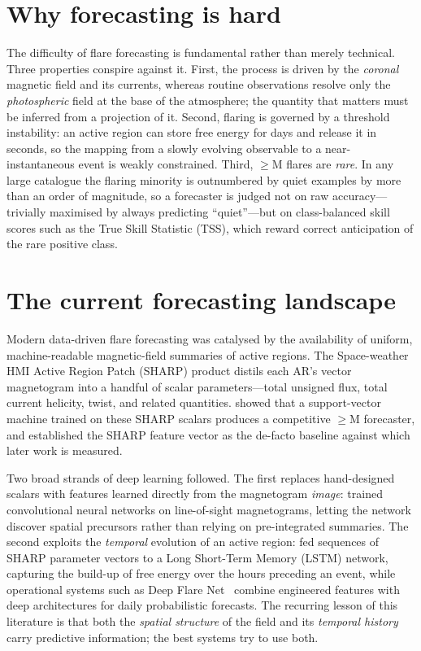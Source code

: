 

\section{Why forecasting is hard}

The difficulty of flare forecasting is fundamental rather than merely technical.
Three properties conspire against it. First, the process is driven by the
\emph{coronal} magnetic field and its currents, whereas routine observations
resolve only the \emph{photospheric} field at the base of the atmosphere; the
quantity that matters must be inferred from a projection of it. Second, flaring
is governed by a threshold instability: an active region can store free energy
for days and release it in seconds, so the mapping from a slowly evolving
observable to a near-instantaneous event is weakly constrained. Third, $\geq$M
flares are \emph{rare}. In any large catalogue the flaring minority is
outnumbered by quiet examples by more than an order of magnitude, so a
forecaster is judged not on raw accuracy---trivially maximised by always
predicting ``quiet''---but on class-balanced skill scores such as the True Skill
Statistic (TSS), which reward correct anticipation of the rare positive class.

\section{The current forecasting landscape}
\label{sec:landscape}

Modern data-driven flare forecasting was catalysed by the availability of
uniform, machine-readable magnetic-field summaries of active regions. The
Space-weather HMI Active Region Patch (SHARP) product distils each AR's vector
magnetogram into a handful of scalar parameters---total unsigned flux, total
current helicity, twist, and related quantities. \citet{bobra2015} showed that a
support-vector machine trained on these SHARP scalars produces a competitive
$\geq$M forecaster, and established the SHARP feature vector as the de-facto
baseline against which later work is measured.

Two broad strands of deep learning followed. The first replaces hand-designed
scalars with features learned directly from the magnetogram \emph{image}:
\citet{huang2018} trained convolutional neural networks on line-of-sight
magnetograms, letting the network discover spatial precursors rather than
relying on pre-integrated summaries. The second exploits the \emph{temporal}
evolution of an active region: \citet{liu2019} fed sequences of SHARP parameter
vectors to a Long Short-Term Memory (LSTM) network, capturing the build-up of
free energy over the hours preceding an event, while operational systems such as
Deep Flare Net~\citep{nishizuka2018} combine engineered features with deep
architectures for daily probabilistic forecasts. The recurring lesson of this
literature is that both the \emph{spatial structure} of the field and its
\emph{temporal history} carry predictive information; the best systems try to
use both.


